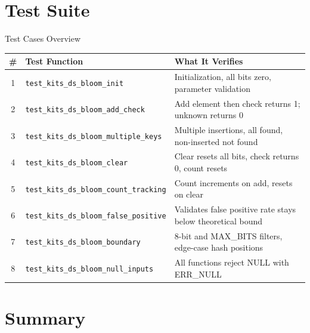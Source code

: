 \documentclass[aspectratio=169, 10pt]{beamer}
\begin{document}
\section{Test Suite}

\begin{frame}{Test Cases Overview}
\begin{table}
\centering
\small
\begin{tabular}{@{}clp{7cm}@{}}
\toprule
\textbf{\#} & \textbf{Test Function} & \textbf{What It Verifies} \\
\midrule
1 & \texttt{test\_kits\_ds\_bloom\_init}
  & Initialization, all bits zero, parameter validation \\
2 & \texttt{test\_kits\_ds\_bloom\_add\_check}
  & Add element then check returns 1; unknown returns 0 \\
3 & \texttt{test\_kits\_ds\_bloom\_multiple\_keys}
  & Multiple insertions, all found, non-inserted not found \\
4 & \texttt{test\_kits\_ds\_bloom\_clear}
  & Clear resets all bits, check returns 0, count resets \\
5 & \texttt{test\_kits\_ds\_bloom\_count\_tracking}
  & Count increments on add, resets on clear \\
6 & \texttt{test\_kits\_ds\_bloom\_false\_positive}
  & Validates false positive rate stays below theoretical bound \\
7 & \texttt{test\_kits\_ds\_bloom\_boundary}
  & 8-bit and MAX\_BITS filters, edge-case hash positions \\
8 & \texttt{test\_kits\_ds\_bloom\_null\_inputs}
  & All functions reject NULL with ERR\_NULL \\
\bottomrule
\end{tabular}
\end{table}
\end{frame}

\section{Summary}
\end{document}
